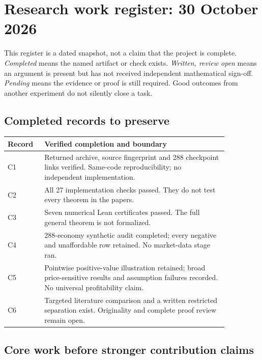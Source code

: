 \clearpage
\section*{Research work register: 30 October 2026}
\begingroup
\renewcommand{\baselinestretch}{1.08}\selectfont
This register is a dated snapshot, not a claim that the project is complete.
\emph{Completed} means the named artifact or check exists. \emph{Written,
review open} means an argument is present but has not received independent
mathematical sign-off. \emph{Pending} means the evidence or proof is still
required. Good outcomes from another experiment do not silently close a task.

\subsection*{Completed records to preserve}
\begin{center}\small
\setlength{\tabcolsep}{4pt}
\begin{tabular}{@{}p{0.13\linewidth}p{0.73\linewidth}@{}}
\toprule
Record & Verified completion and boundary\\
\midrule
C1 & Returned archive, source fingerprint and 288 checkpoint links verified. Same-code reproducibility; no independent implementation.\\
C2 & All 27 implementation checks passed. They do not test every theorem in the papers.\\
C3 & Seven numerical Lean certificates passed. The full general theorem is not formalized.\\
C4 & 288-economy synthetic audit completed; every negative and unaffordable row retained. No market-data stage ran.\\
C5 & Pointwise positive-value illustration retained; broad price-sensitive results and assumption failures recorded. No universal profitability claim.\\
C6 & Targeted literature comparison and a written restricted separation exist. Originality and complete proof review remain open.\\
\bottomrule
\end{tabular}
\end{center}

\subsection*{Core work before stronger contribution claims}

